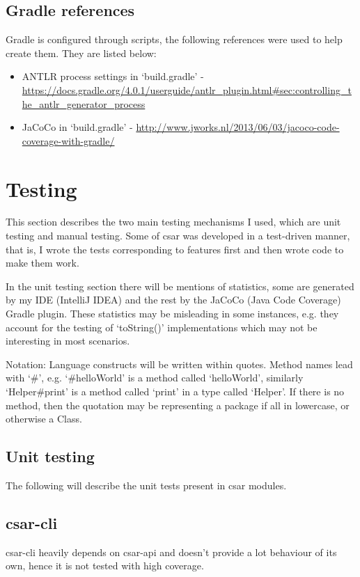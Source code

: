 \documentclass[12pt, letterpaper]{article}
\begin{document}
\subsection{Gradle references}
Gradle is configured through scripts, the following references were used to help create them. They are listed below:

\begin{itemize}
  \item ANTLR process settings in `build.gradle' - \url{https://docs.gradle.org/4.0.1/userguide/antlr\_plugin.html\#sec:controlling\_the\_antlr\_generator\_process}
  \item JaCoCo in `build.gradle' - \url{http://www.jworks.nl/2013/06/03/jacoco-code-coverage-with-gradle/}
\end{itemize}

\section{Testing}
This section describes the two main testing mechanisms I used, which are unit testing and manual testing.
Some of csar was developed in a test-driven manner, that is, I wrote the tests corresponding to features first and then wrote code to make them work.

In the unit testing section there will be mentions of statistics, some are generated by my IDE (IntelliJ IDEA) and the rest by the JaCoCo (Java Code Coverage) Gradle plugin.
These statistics may be misleading in some instances, e.g. they account for the testing of `toString()' implementations which may not be interesting in most scenarios.

Notation: Language constructs will be written within quotes.
Method names lead with `\#', e.g. `\#helloWorld' is a method called `helloWorld', similarly `Helper\#print' is a method called `print' in a type called `Helper'.
If there is no method, then the quotation may be representing a package if all in lowercase, or otherwise a Class.

\subsection{Unit testing}
The following will describe the unit tests present in csar modules.

\subsection{csar-cli}
csar-cli heavily depends on csar-api and doesn't provide a lot behaviour of its own, hence it is not tested with high coverage.
\end{document}
